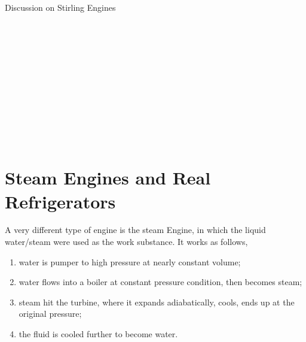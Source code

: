 \documentclass[twoside]{article}
\begin{document}
Discussion on Stirling Engines
\\\\\\\\\\\\\\\\\\\\\\\\
\section{Steam Engines and Real Refrigerators}
A very different type of engine is the steam Engine, in which the liquid water/steam were used as the work substance.
It works as follows,
\begin{enumerate}
\item water is pumper to high pressure at nearly constant volume;
\item water flows into a boiler at constant pressure condition, then becomes steam;
\item steam hit the turbine, where it expands adiabatically, cools, ends up at the original pressure;
\item the fluid is cooled further to become water.
\end{enumerate}
\end{document}
